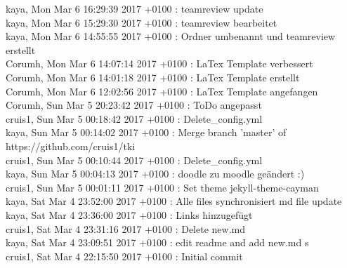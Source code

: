 kaya, Mon Mar 6 16:29:39 2017 +0100 : teamreview update\\
kaya, Mon Mar 6 15:29:30 2017 +0100 : teamreview bearbeitet\\
kaya, Mon Mar 6 14:55:55 2017 +0100 : Ordner umbenannt und teamreview erstellt\\
Corumh, Mon Mar 6 14:07:14 2017 +0100 : LaTex Template verbessert\\
Corumh, Mon Mar 6 14:01:18 2017 +0100 : LaTex Template erstellt\\
Corumh, Mon Mar 6 12:02:56 2017 +0100 : LaTex Template angefangen\\
Corumh, Sun Mar 5 20:23:42 2017 +0100 : ToDo angepasst\\
cruis1, Sun Mar 5 00:18:42 2017 +0100 : Delete\_config.yml\\
kaya, Sun Mar 5 00:14:02 2017 +0100 : Merge branch 'master' of https://github.com/cruis1/tki\\
cruis1, Sun Mar 5 00:10:44 2017 +0100 : Delete\_config.yml\\
kaya, Sun Mar 5 00:04:13 2017 +0100 : doodle zu moodle geändert :)\\
cruis1, Sun Mar 5 00:01:11 2017 +0100 : Set theme jekyll-theme-cayman\\
kaya, Sat Mar 4 23:52:00 2017 +0100 : Alle files synchronisiert md file update\\
kaya, Sat Mar 4 23:36:00 2017 +0100 : Links hinzugefügt\\
cruis1, Sat Mar 4 23:31:16 2017 +0100 : Delete new.md\\
kaya, Sat Mar 4 23:09:51 2017 +0100 : edit readme and add new.md s\\
cruis1, Sat Mar 4 22:15:50 2017 +0100 : Initial commit\\

    
   
